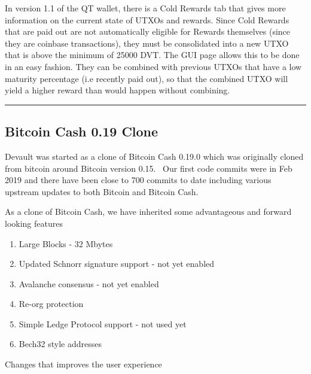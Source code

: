 {In version 1.1 of the QT wallet, there is a Cold Rewards tab that gives
more information on the current state of UTXOs and rewards. Since Cold
Rewards that are paid out are not automatically eligible for Rewards
themselves (since they are coinbase transactions), they must be
consolidated into a new UTXO that is above the minimum of 25000 DVT. The
GUI page allows this to be done in an easy fashion. They can be combined
with previous UTXOs that have a low maturity percentage (i.e recently
paid out), so that the combined UTXO will yield a higher reward than
would happen without combining.}

{}

\begin{center}\rule{0.5\linewidth}{\linethickness}\end{center}

{}

\hypertarget{h.h4zmjemhgqxi}{%
\subsection{\texorpdfstring{{Bitcoin Cash 0.19
Clone}}{Bitcoin Cash 0.19 Clone}}\label{h.h4zmjemhgqxi}}

{Devault was started as a clone of Bitcoin Cash 0.19.0 which was
originally cloned from bitcoin around Bitcoin version 0.15. ~Our first
code commits were in Feb 2019 and there have been close to 700 commits
to date including various upstream updates to both Bitcoin and Bitcoin
Cash. }

{}

{As a clone of Bitcoin Cash, we have inherited some advantageous and
forward looking features}

{}

\begin{enumerate}
\tightlist
\item
  {Large Blocks - 32 Mbytes}
\item
  {Updated Schnorr signature support - not yet enabled}
\item
  {Avalanche consensus - not yet enabled}
\item
  {Re-org protection}
\item
  {Simple Ledge Protocol support - not used yet}
\item
  {Bech32 style addresses}
\end{enumerate}

{}

{Changes that improves the user experience}

{}

